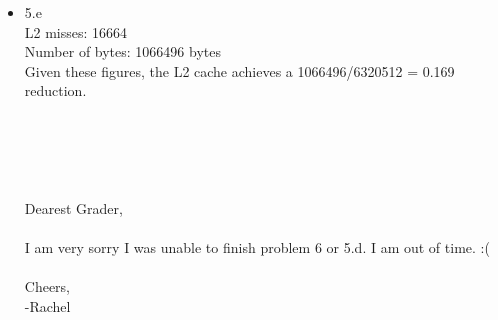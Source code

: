 \documentclass[a4paper]{article}
\begin{document}
\begin{itemize}
\item{5.e} \\
L2 misses: 16664 \\
Number of bytes: 1066496 bytes \\
Given these figures, the L2 cache achieves a 1066496/6320512 = 0.169 reduction.
\\\\\\\\\\\\
Dearest Grader, \\ \\
I am very sorry I was unable to finish problem 6 or 5.d. I am out of time. :(\\ \\
Cheers, \\
-Rachel



\end{itemize}
\end{document}
